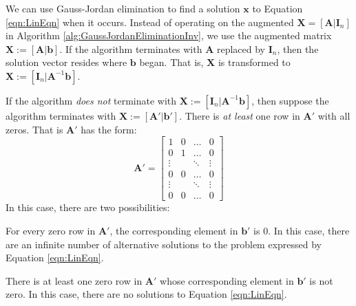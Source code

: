 We can use Gauss-Jordan elimination to find a solution $\mathbf{x}$ to Equation \ref{eqn:LinEqn} when it occurs. Instead of operating on the augmented $\mathbf{X} = [\mathbf{A}|\mathbf{I}_n]$ in Algorithm \ref{alg:GaussJordanEliminationInv}, we use the augmented matrix $\mathbf{X} := [\mathbf{A}|\mathbf{b}]$. If the algorithm terminates with $\mathbf{A}$ replaced by $\mathbf{I}_n$, then the solution vector resides where $\mathbf{b}$ began. That is, $\mathbf{X}$ is transformed to $\mathbf{X} := [\mathbf{I}_n | \mathbf{A}^{-1}\mathbf{b}]$.

If the algorithm \textit{does not} terminate with $\mathbf{X} := [\mathbf{I}_n | \mathbf{A}^{-1}\mathbf{b}]$, then suppose the algorithm terminates with $\mathbf{X} := [\mathbf{A}' | \mathbf{b}']$. There is \textit{at least} one row in $\mathbf{A}'$ with all zeros. That is $\mathbf{A}'$ has the form:
\begin{equation}
\mathbf{A}'=\begin{bmatrix}
1 & 0 & \dots & 0\\
0 & 1 & \dots & 0\\
\vdots & & \ddots & \vdots\\

0 & 0 & \dots & 0\\
\vdots & & \ddots & \vdots\\
0 & 0 & \dots & 0
\end{bmatrix}
\end{equation}
In this case, there are two possibilities:
\begin{enumerate*}
\item For every zero row in $\mathbf{A}'$, the corresponding element in $\mathbf{b'}$ is 0. In this case, there are an infinite number of alternative solutions to the problem expressed by Equation \ref{eqn:LinEqn}. 
\item There is at least one zero row in $\mathbf{A}'$ whose corresponding element in $\mathbf{b}'$ is not zero. In this case, there are no solutions to Equation \ref{eqn:LinEqn}.
\end{enumerate*}

